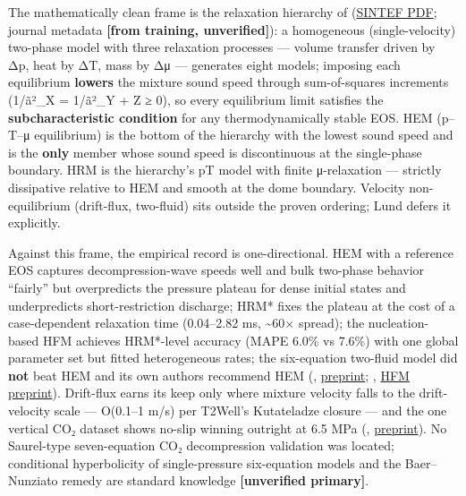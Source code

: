 The mathematically clean frame is the relaxation hierarchy of \citet{lund2012} (\href{https://www.sintef.no/globalassets/project/co2-dynamics/publications/lund_two-phase_relaxation_hierarchy.pdf}{SINTEF PDF}; journal metadata \textbf{{[}from training, unverified{]}}): a homogeneous
(single-velocity) two-phase model with three relaxation processes ---
volume transfer driven by Δp, heat by ΔT, mass by Δμ --- generates eight
models; imposing each equilibrium \textbf{lowers} the mixture sound
speed through sum-of-squares increments (1/ã²\_X = 1/ã²\_Y + Z ≥ 0), so
every equilibrium limit satisfies the \textbf{subcharacteristic
condition} for any thermodynamically stable EOS. HEM (p--T--μ
equilibrium) is the bottom of the hierarchy with the lowest sound speed
and is the \textbf{only} member whose sound speed is discontinuous at
the single-phase boundary. HRM is the hierarchy's pT model with finite
μ-relaxation --- strictly dissipative relative to HEM and smooth at the
dome boundary. Velocity non-equilibrium (drift-flux, two-fluid) sits
outside the proven ordering; Lund defers it explicitly.

Against this frame, the empirical record is one-directional. HEM with a
reference EOS captures decompression-wave speeds well and bulk two-phase
behavior ``fairly'' but overpredicts the pressure plateau for dense
initial states and underpredicts short-restriction discharge; HRM* fixes
the plateau at the cost of a case-dependent relaxation time (0.04--2.82
ms, \textasciitilde60× spread); the nucleation-based HFM achieves
HRM*-level accuracy (MAPE 6.0\% vs 7.6\%) with one global parameter set
but fitted heterogeneous rates; the six-equation two-fluid model did
\textbf{not} beat HEM and its own authors recommend HEM
(\citealp{munkejord2015}, \href{https://www.sintef.no/globalassets/project/co2-dynamics/publications/depress-mix-preprint.pdf}{preprint}; \citealp{log2024hfm}, \href{https://www.pvv.ntnu.no/~stm/dring/hfm_preprint.pdf}{HFM preprint}). Drift-flux earns its keep only where mixture velocity falls
to the drift-velocity scale --- O(0.1--1 m/s) per T2Well's Kutateladze
closure --- and the one vertical CO₂ dataset shows no-slip winning
outright at 6.5 MPa
(\citealp{hammer2021}, \href{https://www.pvv.ntnu.no/~stm/dring/driftflux-well.pdf}{preprint}). No Saurel-type seven-equation CO₂ decompression
validation was located; conditional hyperbolicity of single-pressure
six-equation models and the Baer--Nunziato remedy are standard knowledge
\textbf{{[}unverified primary{]}}.

